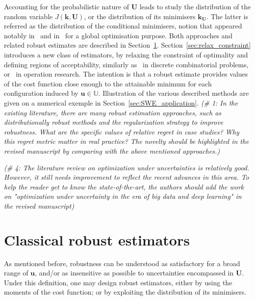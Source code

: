 \documentclass[preprint, review, 1p]{elsarticle}
\newcommand{\Uspace}{\mathbb{U}}
\newcommand{\victor}[1]{{\itshape\color{green} ({#1})}}
\begin{document}
Accounting for the probabilistic nature of  $\mathbf{U}$ leads to study the distribution of the random variable $J(\mathbf{k},\mathbf{U})$, or the distribution of its minimisers ${\mathbf{k}}_{\mathbf{U}}$. The latter is referred as 
the distribution of the conditional minimisers, notion that appeared notably in~\cite{villemonteix_informational_2006} and in~\cite{hennig_entropy_2011} for a global optimisation purpose. Both approaches and related robust estimates are described in Section~\ref{robust formulations}. Section~\ref{sec:relax_constraint} introduces a new class of estimators, by relaxing the constraint of optimality and defining regions of acceptability, similarly as~\cite{buhmann_robust_2013} in discrete combinatorial problems, or~\cite{kouvelis_algorithms_1992,snyder_stochastic_2004} in operation research. The intention is that a robust estimate provides values of the cost function close enough to the attainable minimum for each configuration induced by $\mathbf{u}\in\Uspace$. Illustration of the various described methods are given on a numerical exemple in Section~\ref{sec:SWE_application}.
\victor{\# 1: In the existing literature, there are many robust estimation approaches, such as distributionally robust methods and the regularization strategy to improve robustness. What are the specific values of relative regret in case studies? Why this regret metric matter in real practice? The novelty should be highlighted in the revised manuscript by comparing with the above mentioned approaches.}


\victor{\# 4: The literature review on optimization under uncertainties is relatively good. However, it still needs improvement to reflect the recent advances in this area. To help the reader get to know the state-of-the-art, the authors should add the work on "optimization under uncertainty in the era of big data and deep learning" in the revised manuscript}



\section{Classical robust estimators}
\label{robust formulations}

As mentioned before, robustness can be understood as satisfactory for a broad range of $\mathbf{u}$, and/or as insensitive as possible to uncertainties encompassed in $\mathbf{U}$. Under this definition, one may design robust estimators, either by using the moments of the cost function; or by exploiting the distribution of its minimisers.
\end{document}

